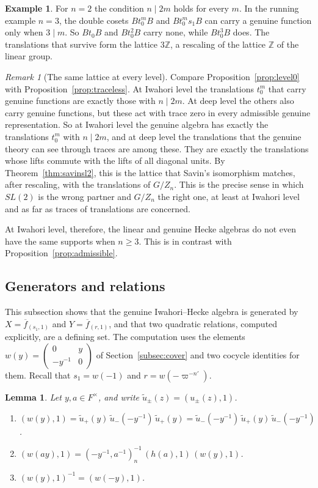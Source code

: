 \documentclass[12pt,letterpaper]{amsart}
\numberwithin{equation}{section}
\newtheorem{lemma}[theorem]{Lemma}
\theoremstyle{definition}
\newtheorem{example}[theorem]{Example}
\theoremstyle{remark}
\newtheorem{remark}[theorem]{Remark}
\newcommand{\Z}{\mathbb{Z}}
\newcommand{\fbar}{\overline{f}}
\newcommand{\mat}[4]{\begin{pmatrix} #1 & #2\\ #3 & #4\end{pmatrix}}
\begin{document}
\begin{example}
\label{ex:level0}
For $n=2$ the condition $n\mid 2m$ holds for every $m$. In the running
example $n=3$, the double cosets $Bt_0^mB$ and $Bt_0^ms_1B$ can carry a
genuine function only when $3\mid m$. So $Bt_0B$ and $Bt_0^2B$ carry
none, while $Bt_0^3B$ does. The translations that survive form the
lattice $3\Z$, a rescaling of the lattice $\Z$ of the linear group.
\end{example}

\begin{remark}[The same lattice at every level]
\label{rem:samelattice}
Compare Proposition~\ref{prop:level0} with
Proposition~\ref{prop:traceless}. At Iwahori level the translations
$t_0^m$ that carry genuine functions are exactly those with $n\mid 2m$.
At deep level the others also carry genuine functions, but these act
with trace zero in every admissible genuine representation. So at
Iwahori level the genuine algebra has exactly the translations $t_0^m$
with $n\mid 2m$, and at deep level the translations that the genuine
theory can see through traces are among these. They are exactly the
translations whose lifts commute with the lifts of all diagonal units.
By Theorem~\ref{thm:savinsl2}, this is the lattice that Savin's
isomorphism matches, after rescaling, with the translations of $G/Z_n$.
This is the precise sense in which $SL(2)$ is the wrong partner and
$G/Z_n$ the right one, at least at Iwahori level and as far as traces
of translations are concerned.
\end{remark}

At Iwahori level, therefore, the linear and genuine Hecke algebras do
not even have the same supports when $n\geq 3$. This is in contrast
with Proposition~\ref{prop:admissible}.

\subsection{Generators and relations}
This subsection shows that the genuine Iwahori--Hecke algebra is
generated by $X=\fbar_{(s_1,1)}$ and $Y=\fbar_{(r,1)}$, and that two
quadratic relations, computed explicitly, are a defining set. The
computation uses the elements $w(y)=\mat 0y{-y^{-1}}0$ of
Section~\ref{subsec:cover} and two cocycle identities for them. Recall
that $s_1=w(-1)$ and $r=w(-\varpi^{-n'})$.

\begin{lemma}
\label{lemma:wformulas}
Let $y,a\in F^\times$, and write $\tilde u_\pm(z)=(u_\pm(z),1)$.
\begin{enumerate}[leftmargin=2em,label=(\alph*)]
\item $(w(y),1)=\tilde u_+(y)\,\tilde u_-(-y^{-1})\,\tilde u_+(y)
=\tilde u_-(-y^{-1})\,\tilde u_+(y)\,\tilde u_-(-y^{-1})$.
\item $(w(ay),1)=(-y^{-1},a^{-1})_n^{-1}\,(h(a),1)\,(w(y),1)$.
\item $(w(y),1)^{-1}=(w(-y),1)$.
\end{enumerate}
\end{lemma}
\end{document}
